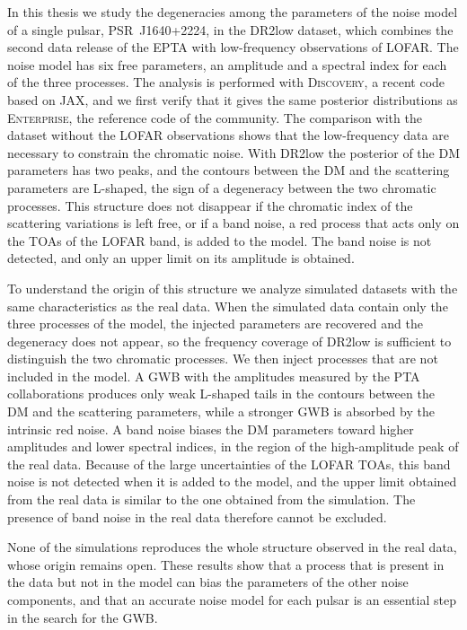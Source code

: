 \documentclass[12pt, oneside]{MastersDoctoralThesis}
\begin{document}
In this thesis we study the degeneracies among the parameters of the noise
model of a single pulsar, PSR~J1640+2224, in the DR2low dataset, which
combines the second data release of the EPTA with low-frequency
observations of LOFAR. The noise model has six free parameters, an
amplitude and a spectral index for each of the three processes. The
analysis is performed with \textsc{Discovery}, a recent code based on JAX,
and we first verify that it gives the same posterior distributions as
\textsc{Enterprise}, the reference code of the community. The comparison
with the dataset without the LOFAR observations shows that the
low-frequency data are necessary to constrain the chromatic noise. With
DR2low the posterior of the DM parameters has two peaks, and the contours
between the DM and the scattering parameters are L-shaped, the sign of a
degeneracy between the two chromatic processes. This structure does not
disappear if the chromatic index of the scattering variations is left
free, or if a band noise, a red process that acts only on the TOAs of the
LOFAR band, is added to the model. The band noise is not detected, and
only an upper limit on its amplitude is obtained.

To understand the origin of this structure we analyze simulated datasets
with the same characteristics as the real data. When the simulated data
contain only the three processes of the model, the injected parameters are
recovered and the degeneracy does not appear, so the frequency coverage of
DR2low is sufficient to distinguish the two chromatic processes. We then
inject processes that are not included in the model. A GWB with the
amplitudes measured by the PTA collaborations produces only weak L-shaped
tails in the contours between the DM and the scattering parameters, while
a stronger GWB is absorbed by the intrinsic red noise. A band noise biases
the DM parameters toward higher amplitudes and lower spectral indices, in
the region of the high-amplitude peak of the real data. Because of the
large uncertainties of the LOFAR TOAs, this band noise is not detected
when it is added to the model, and the upper limit obtained from the real
data is similar to the one obtained from the simulation. The presence of
band noise in the real data therefore cannot be excluded.

None of the simulations reproduces the whole structure observed in the
real data, whose origin remains open. These results show that a process
that is present in the data but not in the model can bias the parameters
of the other noise components, and that an accurate noise model for each
pulsar is an essential step in the search for the GWB.
\tableofcontents
\end{document}
